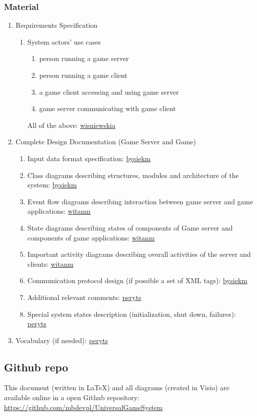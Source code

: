 \documentclass{article}
\begin{document}
\subsubsection{Material}
\begin{enumerate}
  \item Requirements Specification
  \begin{enumerate}
    \item System actors' use cases
    \begin{enumerate}
      \item person running a game server
      \item person running a game client
      \item a game client accessing and using game server
      \item game server communicating with game client
    \end{enumerate}
    All of the above: \url{wisniewskia}
  \end{enumerate}
  \item Complete Design Documentation (Game Server and Game)
  \begin{enumerate}
    \item Input data format specification: \url{bysiekm}
    \item Class diagrams describing structures, modules and architecture of the system: \url{bysiekm}
    \item Event flow diagrams describing interaction between game server and game applications: \url{witanm}
    \item State diagrams describing states of components of Game server and components of game applications: \url{witanm}
    \item Important activity diagrams describing overall activities of the server and clients: \url{witanm}
    \item Communication protocol design (if possible a set of XML tags): \url{bysiekm}
    \item Additional relevant comments: \url{peryts}
    \item Special system states description (initialization, shut down, failures): \url{peryts}
  \end{enumerate}
  \item Vocabulary (if needed): \url{peryts}
\end{enumerate}

\subsection{Github repo}
This document (written in LaTeX) and all diagrams (created in Visio) are available online 
in a open Github repository: \url{https://github.com/mbdevpl/UniversalGameSystem}
\end{document}
